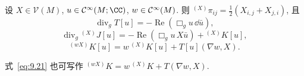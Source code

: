 \begin{proposition}[$T, J, K$ 的恒等式]\label{prop:9.13}
设 $X \in \mathcal{V}(M)$, $u \in \Smooth(M; \CC)$, $w \in \mathcal{C}^\infty(M)$. 则 ${}^{(X)} \pi_{ij} = \frac12 (X_{i,j} + X_{j,i})$, 且
\begin{equation}\label{eq:9.19}
    \operatorname{div}_g T[u] = -\operatorname{Re}(\Box_g u \, \dd \bar u),
\end{equation}
\begin{equation}\label{eq:9.20}
    \operatorname{div}_g {}^{(X)} J[u] = -\operatorname{Re}(\Box_g u \, X \bar u) + {}^{(X)} K[u],
\end{equation}
\begin{equation}\label{eq:9.21}
    {}^{(wX)} K[u] = w \, {}^{(X)} K[u] + T[u](\nabla w, X).
\end{equation}
\end{proposition}

式~\eqref{eq:9.21} 也可写作 ${}^{(wX)} K = w \, {}^{(X)} K + T(\nabla w, X)$.

